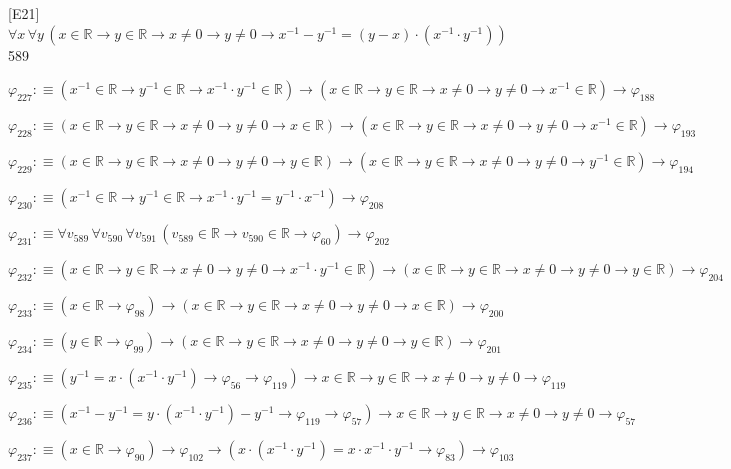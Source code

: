 \begin{fullproof}{[E21]}{$\forall x\,\forall y\,(x \in \mathbb{R} \to y \in \mathbb{R} \to x \neq 0 \to y \neq 0 \to x^{-1} - y^{-1} = (y - x) \cdot (x^{-1} \cdot y^{-1}))$}{589}
\begin{abbrevlist}
\item $\varphi_{227} :\equiv (x^{-1} \in \mathbb{R} \to y^{-1} \in \mathbb{R} \to x^{-1} \cdot y^{-1} \in \mathbb{R}) \to (x \in \mathbb{R} \to y \in \mathbb{R} \to x \neq 0 \to y \neq 0 \to x^{-1} \in \mathbb{R}) \to \varphi_{188}$
\item $\varphi_{228} :\equiv (x \in \mathbb{R} \to y \in \mathbb{R} \to x \neq 0 \to y \neq 0 \to x \in \mathbb{R}) \to (x \in \mathbb{R} \to y \in \mathbb{R} \to x \neq 0 \to y \neq 0 \to x^{-1} \in \mathbb{R}) \to \varphi_{193}$
\item $\varphi_{229} :\equiv (x \in \mathbb{R} \to y \in \mathbb{R} \to x \neq 0 \to y \neq 0 \to y \in \mathbb{R}) \to (x \in \mathbb{R} \to y \in \mathbb{R} \to x \neq 0 \to y \neq 0 \to y^{-1} \in \mathbb{R}) \to \varphi_{194}$
\item $\varphi_{230} :\equiv (x^{-1} \in \mathbb{R} \to y^{-1} \in \mathbb{R} \to x^{-1} \cdot y^{-1} = y^{-1} \cdot x^{-1}) \to \varphi_{208}$
\item $\varphi_{231} :\equiv \forall v_{589}\,\forall v_{590}\,\forall v_{591}\,(v_{589} \in \mathbb{R} \to v_{590} \in \mathbb{R} \to \varphi_{60}) \to \varphi_{202}$
\item $\varphi_{232} :\equiv (x \in \mathbb{R} \to y \in \mathbb{R} \to x \neq 0 \to y \neq 0 \to x^{-1} \cdot y^{-1} \in \mathbb{R}) \to (x \in \mathbb{R} \to y \in \mathbb{R} \to x \neq 0 \to y \neq 0 \to y \in \mathbb{R}) \to \varphi_{204}$
\item $\varphi_{233} :\equiv (x \in \mathbb{R} \to \varphi_{98}) \to (x \in \mathbb{R} \to y \in \mathbb{R} \to x \neq 0 \to y \neq 0 \to x \in \mathbb{R}) \to \varphi_{200}$
\item $\varphi_{234} :\equiv (y \in \mathbb{R} \to \varphi_{99}) \to (x \in \mathbb{R} \to y \in \mathbb{R} \to x \neq 0 \to y \neq 0 \to y \in \mathbb{R}) \to \varphi_{201}$
\item $\varphi_{235} :\equiv (y^{-1} = x \cdot (x^{-1} \cdot y^{-1}) \to \varphi_{56} \to \varphi_{119}) \to x \in \mathbb{R} \to y \in \mathbb{R} \to x \neq 0 \to y \neq 0 \to \varphi_{119}$
\item $\varphi_{236} :\equiv (x^{-1} - y^{-1} = y \cdot (x^{-1} \cdot y^{-1}) - y^{-1} \to \varphi_{119} \to \varphi_{57}) \to x \in \mathbb{R} \to y \in \mathbb{R} \to x \neq 0 \to y \neq 0 \to \varphi_{57}$
\item $\varphi_{237} :\equiv (x \in \mathbb{R} \to \varphi_{90}) \to \varphi_{102} \to (x \cdot (x^{-1} \cdot y^{-1}) = x \cdot x^{-1} \cdot y^{-1} \to \varphi_{83}) \to \varphi_{103}$

\end{abbrevlist}
\end{fullproof}
